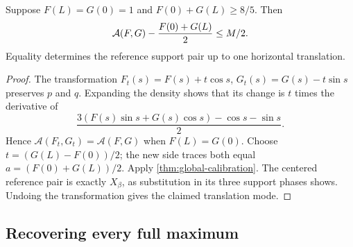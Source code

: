 \begin{corollary}\label{cor:calibration-translation}
Suppose $F(L)=G(0)=1$ and $F(0)+G(L)\ge8/5$. Then
\[
 \mathcal A(F,G)-\frac{F(0)+G(L)}2\le M/2.
\]
Equality determines the reference support pair up to one horizontal
translation.
\end{corollary}
\begin{proof}
The transformation $F_t(s)=F(s)+t\cos s$,
$G_t(s)=G(s)-t\sin s$ preserves $p$ and $q$. Expanding the density
shows that its change is $t$ times the derivative of
\[
 \frac{3(F(s)\sin s+G(s)\cos s)-\cos s-\sin s}{2}.
\]
Hence $\mathcal A(F_t,G_t)=\mathcal A(F,G)$ when $F(L)=G(0)$.
Choose $t=(G(L)-F(0))/2$; the new side traces both equal
$a=(F(0)+G(L))/2$. Apply \cref{thm:global-calibration}.
The centered reference pair is exactly $X_\beta$, as substitution
in its three support phases shows. Undoing the transformation
gives the claimed translation mode.
\end{proof}

\subsection{Recovering every full maximum}

